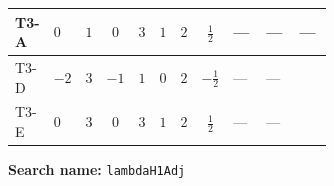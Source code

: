 \documentclass[8pt]{article}
\begin{document}
\begin{landscape}
\begin{longtable}{@{}llcccccc >{\raggedright\arraybackslash}p{0.21\linewidth} >{\raggedright\arraybackslash}p{0.21\linewidth} >{\raggedright\arraybackslash}p{0.21\linewidth}@{}}
\midrule
T3-A & $0$ & $1$ & $0$ & $3$ & $1$ & $2$ & $\frac{1}{2}$ & --- & --- & --- \\
\midrule
T3-D & $-2$ & $3$ & $-1$ & $1$ & $0$ & $2$ & $-\frac{1}{2}$ & --- & --- & \scriptsize\adjustbox{max width=\linewidth}{$\begin{gathered} +2 {\lambda_H} {\lambda_{H1}^{\rm Adj}}\end{gathered}$} \\
\midrule
T3-E & $0$ & $3$ & $0$ & $3$ & $1$ & $2$ & $\frac{1}{2}$ & --- & --- & \scriptsize\adjustbox{max width=\linewidth}{$\begin{gathered} +2 {\lambda_H} {\lambda_{H1}^{\rm Adj}}\end{gathered}$} \\
\midrule
\bottomrule
\end{longtable}
\clearpage
\noindent\textbf{Search name: }\texttt{lambdaH1Adj}\par\smallskip

\end{landscape}
\end{document}
